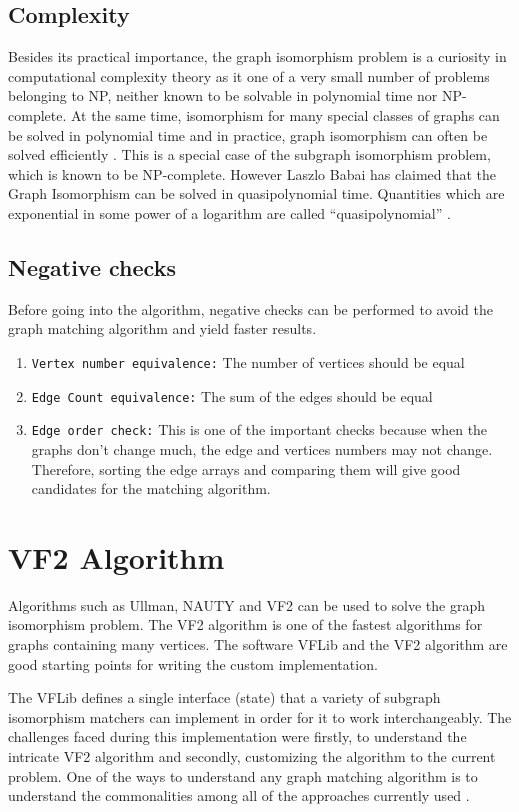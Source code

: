 \subsection{Complexity}
Besides its practical importance, the graph isomorphism problem is a curiosity in computational complexity theory as it one of a
very small number of problems belonging to NP, neither known to be solvable in polynomial time nor NP-complete. At the same time, isomorphism
for many special classes of graphs can be solved in polynomial time and in practice, graph isomorphism can often be solved efficiently \cite{iso2}.
This is a special case of the subgraph isomorphism problem, which is known to be NP-complete. However Laszlo Babai has claimed that the 
Graph Isomorphism can be solved in quasipolynomial time. Quantities which are exponential in some power of a logarithm are called “quasipolynomial” \cite{iso3}.

\subsection{Negative checks}
Before going into the algorithm, negative checks can be performed to avoid the graph matching algorithm and yield faster results.
\begin{enumerate}
\item \texttt{Vertex number equivalence:} The number of vertices should be equal

\item \texttt{Edge Count equivalence:} The sum of the edges should be equal

\item \texttt{Edge order check:} This is one of the important checks because when the graphs don't change much, the edge and vertices numbers may not change. Therefore, sorting the edge arrays and comparing them will give good candidates for the matching algorithm.
\end{enumerate}

\section{VF2 Algorithm}
Algorithms such as Ullman, NAUTY and VF2 can be used to solve the graph isomorphism problem. The VF2 algorithm is one of the fastest algorithms for graphs containing many vertices. The software VFLib and the VF2 algorithm are good starting points for writing the custom implementation. 

The VFLib defines a single interface (state) that a variety of subgraph isomorphism matchers can implement in order for it to work interchangeably. The challenges faced during this implementation  were firstly, to understand the intricate VF2 algorithm and secondly, customizing the algorithm to the current problem. One of the ways to understand any graph matching algorithm is to understand the commonalities among all of the approaches currently used . 

